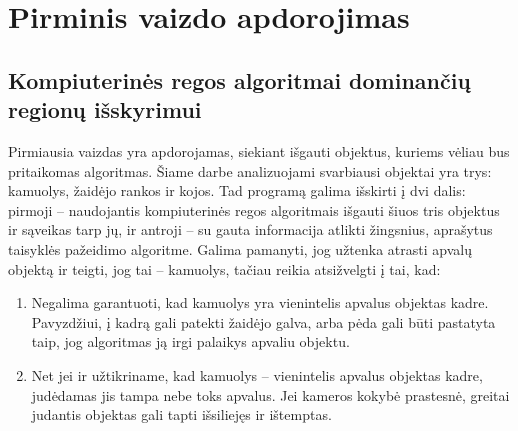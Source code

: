 \documentclass{VUMIFPSkursinis}
\begin{document}
\section{Pirminis vaizdo apdorojimas}
\subsection{Kompiuterinės regos algoritmai dominančių regionų išskyrimui}
Pirmiausia vaizdas yra apdorojamas, siekiant išgauti objektus, kuriems vėliau bus pritaikomas algoritmas. Šiame darbe analizuojami svarbiausi objektai yra trys: kamuolys, žaidėjo rankos ir kojos. Tad programą galima išskirti į dvi dalis: pirmoji – naudojantis kompiuterinės regos algoritmais išgauti šiuos tris objektus ir sąveikas tarp jų, ir antroji – su gauta informacija atlikti žingsnius, aprašytus taisyklės pažeidimo algoritme. 
Galima pamanyti, jog užtenka atrasti apvalų objektą ir teigti, jog tai – kamuolys, tačiau reikia atsižvelgti į tai, kad: 
\begin{enumerate}
\item Negalima garantuoti, kad kamuolys yra vienintelis apvalus objektas kadre. Pavyzdžiui, į kadrą gali patekti žaidėjo galva, arba pėda gali būti pastatyta taip, jog algoritmas ją irgi palaikys apvaliu objektu. 
\item Net jei ir užtikriname, kad kamuolys – vienintelis apvalus objektas kadre, judėdamas jis tampa nebe toks apvalus. Jei kameros kokybė prastesnė, greitai judantis objektas gali tapti išsiliejęs ir ištemptas.
\end{enumerate}
\end{document}
